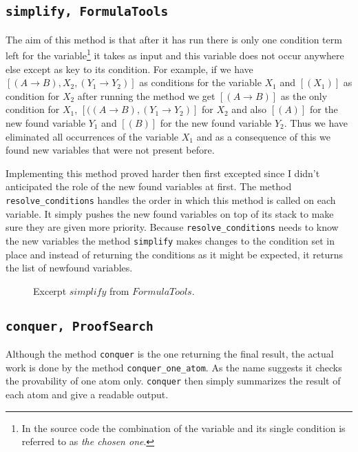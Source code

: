 \subsection[simplify]{\texttt{simplify, FormulaTools}}

The aim of this method is that after it has run there is only one condition term left for the variable\footnote{In the source code the combination of the variable and its single condition is referred to as \emph{the chosen one}.} it takes as input and this variable does not occur anywhere else except as key to its condition. For example, if we have $ [(A \rightarrow B), X_2, (Y_1 \rightarrow Y_2)]$ as conditions for the variable $X_1$ and $[(X_1)]$ as condition for $X_2$ after running the method we get $[(A \rightarrow B)]$ as the only condition for $X_1$, $[((A \rightarrow B), (Y_1 \rightarrow Y_2)]$ for $X_2$ and also $[(A)]$ for the new found variable $Y_1$ and $[(B)]$ for the new found variable $Y_2$. Thus we have eliminated all occurrences of the variable $X_1$ and as a consequence of this we found new variables that were not present before. 

Implementing this method proved harder then first excepted since I didn't anticipated the role of the new found variables at first. The method \texttt{resolve\_conditions} handles the order in which this method is called on each variable. It simply pushes the new found variables on top of its stack to make sure they are given more priority. Because \texttt{resolve\_conditions} needs to know the new variables the method \texttt{simplify} makes changes to the condition set in place and instead of returning the conditions as it might be expected, it returns the list of newfound variables.

\begin{figure}[H]
	\caption{Excerpt $simplify$ from $FormulaTools$.}
	\vspace{-10pt}
	
	\vspace{-10pt}
\end{figure}


\subsection[conquer]{\texttt{conquer, ProofSearch}}
Although the method \texttt{conquer} is the one returning the final result, the actual work is done by the method \texttt{conquer\_one\_atom}. As the name suggests it checks the provability of one atom only. \texttt{conquer} then simply summarizes the result of each atom and give a readable output.

